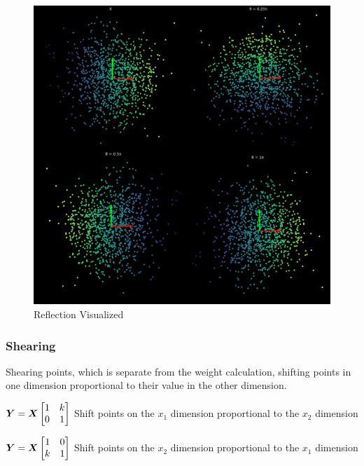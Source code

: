 \begin{figure}[h!]
\begin{center}
\includegraphics{students/SP19_DL_Lab_1_Notes/images/Reflection.png}
\end{center} 
\caption{Reflection Visualized}
\label{fig:mon}
\end{figure}
\FloatBarrier

\subsubsection{Shearing}
Shearing points, which is separate from the weight calculation, shifting points in one dimension proportional to their value in the other dimension.

\(\bm{Y} = \bm{X}  \begin{bmatrix}
    1 & k\\
    0 & 1
\end{bmatrix} \) 
Shift points on the \(x_1\) dimension proportional to the \(x_2\) dimension

\(\bm{Y} = \bm{X}  \begin{bmatrix}
    1 & 0\\
    k & 1
\end{bmatrix} \)
Shift points on the \(x_2\) dimension proportional to the \(x_1\) dimension

